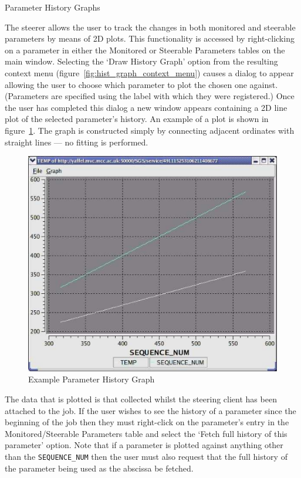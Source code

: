 \documentclass[a4paper,twoside]{article}
\begin{document}

\begin{section}{Parameter History Graphs}
\label{sec:hist_graphs}

The steerer allows the user to track the changes in both monitored and
steerable parameters by means of 2D plots.  This functionality is
accessed by right-clicking on a parameter in either the Monitored or
Steerable Parameters tables on the main window.  Selecting the `Draw
History Graph' option from the resulting context menu
(figure~\ref{fig:hist_graph_context_menu}) causes a dialog to appear allowing
the user to choose which parameter to plot the chosen one against.
(Parameters are specified using the label with which they were
registered.)  Once the user has completed this dialog a new window
appears containing a 2D line plot of the selected parameter's
history. An example of a plot is shown in
figure~\ref{fig:eg_param_hist_plot}.  The graph is constructed simply
by connecting adjacent ordinates with straight lines --- no fitting is
performed.

\begin{figure}
\centerline{\includegraphics{hist_plot_2curves.png}}
\caption{Example Parameter History Graph}
\label{fig:eg_param_hist_plot}
\end{figure}

The data that is plotted is that collected whilst the steering client
has been attached to the job. If the user wishes to see the history of
a parameter since the beginning of the job then they must right-click
on the parameter's entry in the Monitored/Steerable Parameters table
and select the `Fetch full history of this parameter' option.  Note
that if a parameter is plotted against anything other than the
\texttt{SEQUENCE\_NUM} then the user must also request that the full
history of the parameter being used as the abscissa be fetched.


\end{section}
\end{document}

